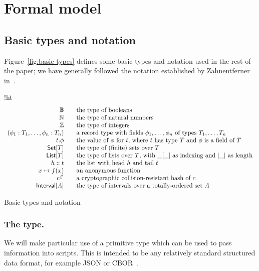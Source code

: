 \section{Formal model}
\label{sec:formal-model}

\subsection{Basic types and notation}
\label{sec:basic-notation}
Figure~\ref{fig:basic-types} defines some basic types and
notation used in the rest of the paper; we have generally followed the
notation established by Zahnentferner in~\cite{Zahnentferner18-UTxO}.

\begin{ruledfigure}{!ht}
  \begin{displaymath}
    \begin{array}{rll}
      \mathbb{B}{} && \mbox{the type of booleans}\\
      \mathbb{N}{} && \mbox {the type of natural numbers}\\
      \mathbb{Z}{} && \mbox {the type of integers}\\
      (\phi_1 : T_1, \ldots, \phi_n : T_n) && \mbox{a record type with fields $\phi_1, \ldots, \phi_n$ of types $T_1, \ldots, T_n$}\\
      t.\phi && \mbox{the value of $\phi$ for $t$, where $t$ has type $T$ and
                $\phi$ is a field of $T$}\\
      \textsf{Set}[T] && \mbox{the type of (finite) sets over $T$}\\
      \textsf{List}[T] && \mbox{the type of lists over $T$, with $\_[\_]$ as indexing
        and $|\_|$ as length}\\
      h::t && \mbox{the list with head $h$ and tail $t$}\\
      x \mapsto f(x) && \mbox{an anonymous function}\\
      c^{\#} && \mbox{a cryptographic collision-resistant hash of $c$}\\
      \textsf{Interval}[A] && \mbox{the type of intervals over a totally-ordered set $A$}
    \end{array}
  \end{displaymath}
  \caption{Basic types and notation}
  \label{fig:basic-types}
\end{ruledfigure}

\subsubsection{The \Data{} type.}
\label{sec:data}
We will make particular use of a primitive type \Data{} which can be
used to pass information into scripts. This is intended to be any
relatively standard structured data format, for example JSON or
CBOR~\cite{cbor}.

